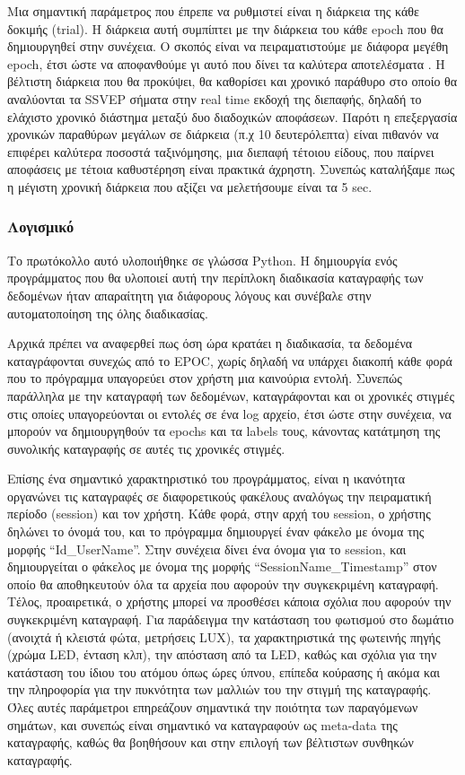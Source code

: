 \documentclass[11pt,a4paper,english,greek,twoside]{../Thesis}
\begin{document}
\par Μια σημαντική παράμετρος που έπρεπε να ρυθμιστεί είναι η διάρκεια της κάθε δοκιμής (trial). Η διάρκεια αυτή συμπίπτει με την διάρκεια του κάθε epoch που θα δημιουργηθεί στην συνέχεια. Ο σκοπός είναι να πειραματιστούμε με διάφορα μεγέθη epoch, έτσι ώστε να αποφανθούμε γι αυτό που δίνει τα καλύτερα αποτελέσματα .  Η βέλτιστη διάρκεια που θα προκύψει, θα καθορίσει και χρονικό παράθυρο στο οποίο θα αναλύονται τα SSVEP σήματα στην real time εκδοχή της διεπαφής, δηλαδή το ελάχιστο χρονικό διάστημα μεταξύ δυο διαδοχικών αποφάσεων. Παρότι η επεξεργασία χρονικών παραθύρων μεγάλων σε διάρκεια (π.χ 10 δευτερόλεπτα) είναι πιθανόν να επιφέρει καλύτερα ποσοστά ταξινόμησης, μια διεπαφή τέτοιου είδους, που παίρνει αποφάσεις με τέτοια καθυστέρηση είναι πρακτικά άχρηστη. Συνεπώς καταλήξαμε πως η μέγιστη χρονική διάρκεια που αξίζει να μελετήσουμε είναι τα 5 sec. 

\subsubsection{Λογισμικό}

\par Το πρωτόκολλο αυτό υλοποιήθηκε σε γλώσσα Python. Η δημιουργία ενός προγράμματος που θα υλοποιεί αυτή την περίπλοκη διαδικασία καταγραφής των δεδομένων ήταν απαραίτητη για διάφορους λόγους και συνέβαλε στην αυτοματοποίηση της όλης διαδικασίας. 
\par Αρχικά πρέπει να αναφερθεί πως όση ώρα κρατάει η διαδικασία, τα δεδομένα καταγράφονται συνεχώς από το EPOC, χωρίς δηλαδή να υπάρχει διακοπή κάθε φορά που το πρόγραμμα υπαγορεύει στον χρήστη μια καινούρια εντολή. Συνεπώς παράλληλα με την καταγραφή των δεδομένων, καταγράφονται και οι χρονικές στιγμές στις οποίες υπαγορεύονται οι εντολές σε ένα log αρχείο, έτσι ώστε στην συνέχεια, να μπορούν να δημιουργηθούν τα epochs και τα labels τους, κάνοντας κατάτμηση της συνολικής καταγραφής σε αυτές τις χρονικές στιγμές. 
\par Επίσης ένα σημαντικό χαρακτηριστικό του προγράμματος, είναι η ικανότητα οργανώνει τις καταγραφές σε διαφορετικούς φακέλους αναλόγως την πειραματική περίοδο (session) και τον χρήστη. Κάθε φορά, στην αρχή του session, ο χρήστης δηλώνει το όνομά του, και το πρόγραμμα δημιουργεί έναν φάκελο με όνομα της μορφής “Id\_UserName”. Στην συνέχεια δίνει ένα όνομα για το session, και δημιουργείται ο φάκελος με όνομα της μορφής “SessionName\_Timestamp” στον οποίο θα αποθηκευτούν όλα τα αρχεία που αφορούν την συγκεκριμένη καταγραφή. Τέλος, προαιρετικά, ο χρήστης μπορεί να προσθέσει κάποια σχόλια που αφορούν την συγκεκριμένη καταγραφή. Για παράδειγμα την κατάσταση του φωτισμού στο δωμάτιο (ανοιχτά ή κλειστά φώτα, μετρήσεις LUX), τα χαρακτηριστικά της φωτεινής πηγής (χρώμα LED, ένταση κλπ), την απόσταση από τα LED, καθώς και σχόλια για την κατάσταση του ίδιου του ατόμου όπως ώρες ύπνου, επίπεδα κούρασης ή ακόμα και την πληροφορία για την πυκνότητα των μαλλιών του την στιγμή της καταγραφής. Όλες αυτές παράμετροι επηρεάζουν σημαντικά την ποιότητα των παραγόμενων σημάτων, και συνεπώς είναι σημαντικό να καταγραφούν ως meta-data της καταγραφής, καθώς θα βοηθήσουν και στην επιλογή των βέλτιστων συνθηκών καταγραφής.
\end{document}
